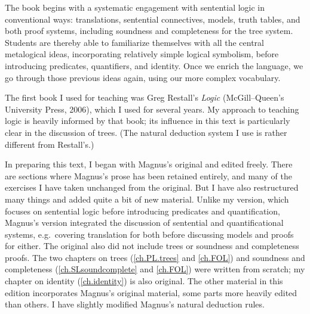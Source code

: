 The book begins with a systematic engagement with sentential logic in conventional ways: translations, sentential connectives, models, truth tables, and both proof systems, including soundness and completeness for the tree system. Students are thereby able to familiarize themselves with all the central metalogical ideas, incorporating relatively simple logical symbolism, before introducing predicates, quantifiers, and identity. Once we enrich the language, we go through those previous ideas again, using our more complex vocabulary.

The first book I used for teaching was Greg Restall's \emph{Logic} (McGill--Queen's University Press, 2006), which I used for several years. My approach to teaching logic is heavily informed by that book; its influence in this text is particularly clear in the discussion of trees. (The natural deduction system I use is rather different from Restall's.)

In preparing this text, I began with Magnus's original and edited freely. There are sections where Magnus's prose has been retained entirely, and many of the exercises I have taken unchanged from the original. But I have also restructured many things and added quite a bit of new material. Unlike my version, which focuses on sentential logic before introducing predicates and quantification, Magnus's version integrated the discussion of sentential and quantificational systems, e.g.\ covering translation for both before discussing models and proofs for either. The original also did not include trees or soundness and completeness proofs. The two chapters on trees (\ref{ch.PL.trees} and \ref{ch.FOL}) and soundness and completeness (\ref{ch.SLsoundcomplete} and \ref{ch.FOL}) were written from scratch; my chapter on identity (\ref{ch.identity}) is also original. The other material in this edition incorporates Magnus's original material, some parts more heavily edited than others. I have slightly modified Magnus's natural deduction rules.

